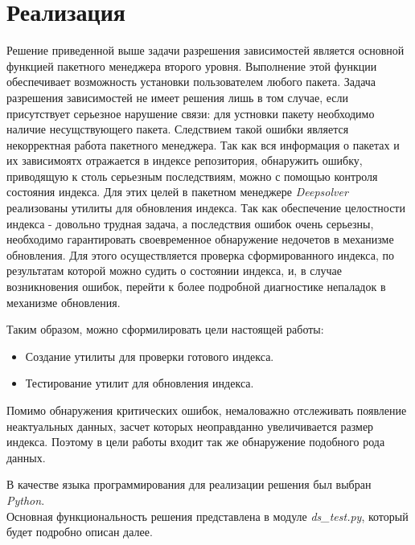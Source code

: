 \section{Реализация}
Решение приведенной выше задачи разрешения зависимостей является основной
функцией пакетного менеджера второго уровня. Выполнение этой функции обеспечивает
возможность установки пользователем любого пакета. Задача разрешения
зависимостей не имеет решения лишь в том случае, если присутствует
серьезное нарушение связи: для устновки пакету необходимо наличие
несущствующего пакета. Следствием такой ошибки является некорректная 
работа пакетного менеджера. Так как вся информация о пакетах и их 
зависимоятх отражается в индексе репозитория, обнаружить ошибку,
приводящую к столь серьезным последствиям, можно с помощью
контроля состояния индекса. Для этих целей в пакетном менеджере 
\textit{Deepsolver} реализованы утилиты для обновления индекса. 
Так как обеспечение целостности индекса - довольно трудная задача, а 
последствия ошибок очень серьезны, необходимо гарантировать своевременное
обнаружение недочетов в механизме обновления. Для этого осуществляется
проверка сформированного индекса, по результатам которой можно
судить о состоянии индекса, и, в случае возникновения ошибок, перейти
к более подробной диагностике непаладок в механизме обновления. 

Таким образом, можно сформилировать цели настоящей работы:
\begin{itemize}
\item{Создание утилиты для проверки готового индекса.}
\item{Тестирование утилит для обновления индекса.}
\end{itemize}

Помимо обнаружения критических ошибок, немаловажно отслеживать 
появление неактуальных данных, засчет которых неоправданно 
увеличивается размер индекса. Поэтому в цели работы входит
так же обнаружение подобного рода данных.

В качестве языка программирования для реализации решения был выбран \textit{Python}.\\
Основная функциональность решения представлена в модуле \textit{ds\_test.py}, который
будет подробно описан далее.

